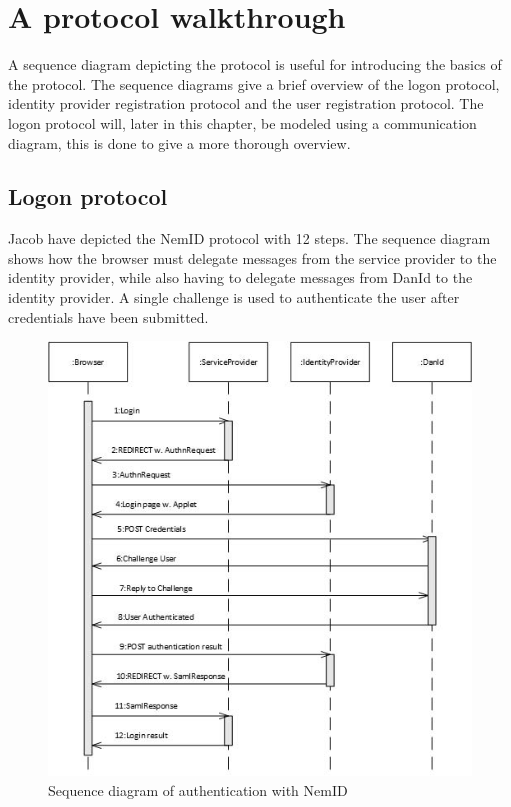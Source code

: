 \documentclass[twosided]{report}
\begin{document}
\section{A protocol walkthrough}
A sequence diagram depicting the protocol is useful for introducing the basics of the protocol. The sequence diagrams give a brief overview of the logon protocol, identity provider registration protocol and the user registration protocol. The logon protocol will, later in this chapter, be modeled using a communication diagram, this is done to give a more thorough overview.

\subsection{Logon protocol}
Jacob have depicted the NemID protocol with 12 steps. The sequence diagram shows how the browser must delegate messages from the service provider to the identity provider, while also having to delegate messages from DanId to the identity provider. A single challenge is used to authenticate the user after credentials have been submitted.

\begin{figure}[H]
	\centering
	\includegraphics{images/Sequence-login-Jacob.jpg}
	\caption[Sequence diagram of authentication with NemID]{Sequence diagram of authentication with NemID \cite{jacob}}
\end{figure}
\end{document}
